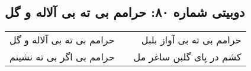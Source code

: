\begin{center}
\section*{دوبیتی شماره ۸۰: حرامم بی ته بی آلاله و گل}
\label{sec:080}
\begin{longtable}{l p{0.5cm} r}
حرامم بی ته بی آلاله و گل
&&
حرامم بی ته بی آواز بلبل
\\
حرامم بی اگر بی ته نشینم
&&
کشم در پای گلبن ساغر مل
\\
\end{longtable}
\end{center}
